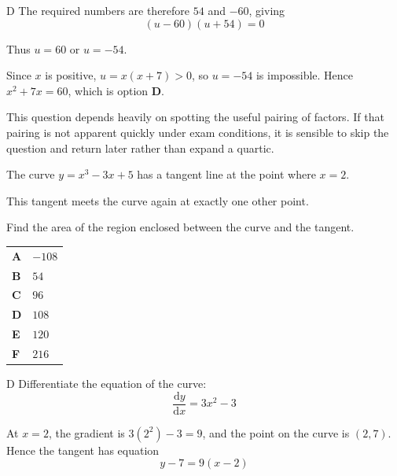 \documentclass[11pt,a4paper]{article}
\begin{document}
\begin{enumerate}[label=\textbf{\arabic*.},leftmargin=*,itemsep=0pt,start=4]
\begin{djsSolution}{D}
The required numbers are therefore $54$ and $-60$, giving
\[
(u-60)(u+54)=0
\]

Thus $u=60$ or $u=-54$. 

Since $x$ is positive, $u=x(x+7)>0$, so $u=-54$ is impossible. Hence $x^2+7x=60$, which is option \textbf{D}.

This question depends heavily on spotting the useful pairing of factors. If that pairing is not apparent quickly under exam conditions, it is sensible to skip the question and return later rather than expand a quartic.
\end{djsSolution}
\end{enumerate}
\clearpage
\thispagestyle{djssolutions}
\vspace*{8pt}
\begin{enumerate}[label=\textbf{\arabic*.},leftmargin=*,itemsep=0pt,start=5]
\questionitem[Integration]
The curve $y = x^3 - 3x + 5$ has a tangent line at the point where $x = 2$. 

This tangent meets the curve again at exactly one other point. 

Find the area of the region enclosed between the curve and the tangent.

\par\vspace*{12pt}
\begin{tabularx}{\linewidth}{@{}>{\bfseries}l Y@{}}
A &
$-108$
\\[0.8em]
B &
$54$
\\[0.8em]
C &
$96$
\\[0.8em]
D &
$108$
\\[0.8em]
E &
$120$
\\[0.8em]
F &
$216$
\\
\end{tabularx}

\begin{djsSolution}{D}
Differentiate the equation of the curve:
\[
\frac{\mathrm{d}y}{\mathrm{d}x}=3x^2-3
\]

At $x=2$, the gradient is $3(2^2)-3=9$, and the point on the curve is $(2,7)$. Hence the tangent has equation
\[
y-7=9(x-2)
\]


\end{djsSolution}
\end{enumerate}
\end{document}
